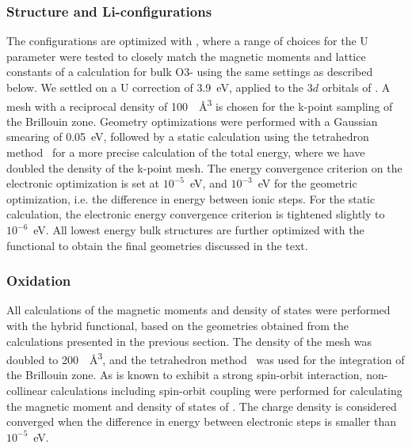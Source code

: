 \begin{refsection}
\subsubsection{Structure and Li-configurations} \label{appendix:sec-structure} 

The configurations are optimized with , where a range of choices 
for the U parameter were tested to closely match the magnetic moments and 
lattice constants of a  calculation for bulk O3- using 
the same settings as described below. We settled on a U correction of 
3.9~\si{\electronvolt}, applied to the 3$d$ orbitals of . A 
mesh with a reciprocal density of 100~\si{\per\angstrom\cubed} is chosen for the 
k-point sampling of the Brillouin zone. Geometry optimizations were performed 
with a Gaussian smearing of 0.05~\si{\electronvolt}, followed by a static 
calculation using the tetrahedron method~\cite{Blochl1994a} for a more precise 
calculation of the total energy, where we have doubled the density of the 
k-point mesh. The energy convergence criterion on the 
electronic optimization is set at $10^{-5}$~\si{\electronvolt}, and 
$10^{-3}$~\si{\electronvolt} for the geometric optimization, i.e. the 
difference in energy between ionic steps. For the static calculation, the 
electronic energy convergence criterion is tightened slightly to 
$10^{-6}$~\si{\electronvolt}. All lowest energy bulk structures are 
further optimized with the  functional to obtain the final 
geometries discussed in the text. 

 \label{appendix:sec-oxidation} 
\subsubsection{Oxidation}

All calculations of the magnetic moments and density of states were performed 
with the hybrid  functional, based on the geometries obtained from 
the calculations presented in the previous section. The density of the
 mesh was doubled to 200~\si{\per\angstrom\cubed}, and the 
tetrahedron method~\cite{Blochl1994a} was used for the integration of the 
Brillouin zone. As  is known to exhibit a strong spin-orbit interaction, 
non-collinear calculations including spin-orbit coupling were performed for 
calculating the magnetic moment and density of states of . The 
charge density is considered converged when the difference in energy between 
electronic steps is smaller than $10^{-5}$~\si{\electronvolt}.
 

\end{refsection}
